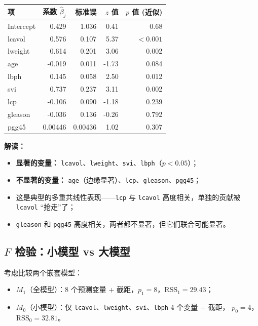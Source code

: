\begin{center}
\renewcommand{\arraystretch}{1.3}
\small
\begin{tabular}{l|r|r|r|r}
\toprule
\textbf{项} & \textbf{系数 $\hat{\beta}_j$} & \textbf{标准误} & \textbf{$z$ 值} & \textbf{$p$ 值 (近似)} \\
\midrule
Intercept  &  0.429 & 1.036 &  0.41 & 0.68 \\
lcavol     &  0.576 & 0.107 &  5.37 & $<0.001$ \\
lweight    &  0.614 & 0.201 &  3.06 & 0.002 \\
age        & -0.019 & 0.011 & -1.73 & 0.084 \\
lbph       &  0.145 & 0.058 &  2.50 & 0.012 \\
svi        &  0.737 & 0.237 &  3.11 & 0.002 \\
lcp        & -0.106 & 0.090 & -1.18 & 0.239 \\
gleason    & -0.036 & 0.136 & -0.26 & 0.792 \\
pgg45      &  0.00446 & 0.00436 & 1.02 & 0.307 \\
\bottomrule
\end{tabular}
\end{center}

\medskip
\noindent
\textbf{解读：}
\begin{itemize}
    \item \textbf{显著的变量：} \texttt{lcavol}、\texttt{lweight}、\texttt{svi}、\texttt{lbph}（$p < 0.05$）；
    \item \textbf{不显著的变量：} \texttt{age}（边缘显著）、\texttt{lcp}、\texttt{gleason}、\texttt{pgg45}；
    \item 这是典型的多重共线性表现——\texttt{lcp} 与 \texttt{lcavol} 高度相关，单独的贡献被 \texttt{lcavol} ``抢走''了；
    \item \texttt{gleason} 和 \texttt{pgg45} 高度相关，两者都不显著，但它们联合可能显著。
\end{itemize}

\subsection{$F$ 检验：小模型 vs 大模型}

考虑比较两个嵌套模型：
\begin{itemize}
    \item $M_1$（全模型）：8 个预测变量 + 截距，$p_1 = 8$，$\mathrm{RSS}_1 = 29.43$；
    \item $M_0$（小模型）：仅 \texttt{lcavol}、\texttt{lweight}、\texttt{svi}、\texttt{lbph} 4 个变量 + 截距，
    $p_0 = 4$，$\mathrm{RSS}_0 = 32.81$。
\end{itemize}

